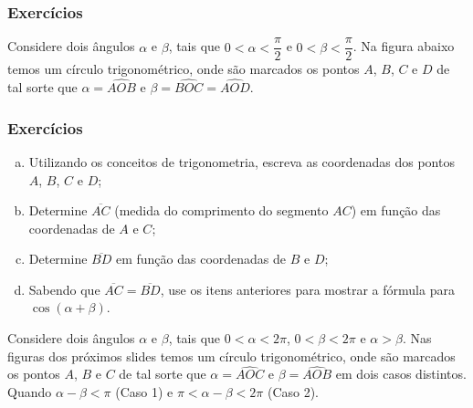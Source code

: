 
\begin{frame}
\frametitle{Exercícios} 

\begin{exercise}
	Considere dois ângulos $\alpha$ e $\beta$, tais que $0 < \alpha < \dfrac \pi 2$ e $0 < \beta < \dfrac \pi 2$. Na figura abaixo temos um círculo trigonométrico, onde são marcados os pontos $A$, $B$, $C$ e $D$ de tal sorte que $\alpha = \widehat{AOB}$ e $\beta = \widehat{BOC} = \widehat{AOD}$.
	\begin{figure}[H]
		\centering
	  \label{fig:cos-da-soma}
	\end{figure}
\end{exercise}

\end{frame}



\begin{frame}
\frametitle{Exercícios} 
	\begin{enumerate}[a)]
	  \item Utilizando os conceitos de trigonometria, escreva as coordenadas dos pontos $A$, $B$, $C$ e $D$;
	  \item Determine $\overline{AC}$ (medida do comprimento do segmento $AC$) em função das coordenadas de $A$ e $C$;
	  \item Determine $\overline{BD}$ em função das coordenadas de $B$ e $D$;
	  \item Sabendo que $\overline{AC} = \overline{BD}$, use os itens anteriores para mostrar a fórmula para $\cos (\alpha + \beta)$.
	\end{enumerate}
  
  
\begin{exercise}
	Considere dois ângulos $\alpha$ e $\beta$, tais que $0 < \alpha < 2 \pi$, $0 < \beta < 2 \pi$ e $\alpha > \beta$. Nas figuras dos próximos slides temos um círculo trigonométrico, onde são marcados os pontos $A$, $B$ e $C$ de tal sorte que $\alpha = \widehat{AOC}$ e $\beta = \widehat{AOB}$ em dois casos distintos. Quando $\alpha - \beta < \pi$ (Caso 1) e $\pi < \alpha - \beta < 2\pi$ (Caso 2). 
\end{exercise}

\end{frame}


